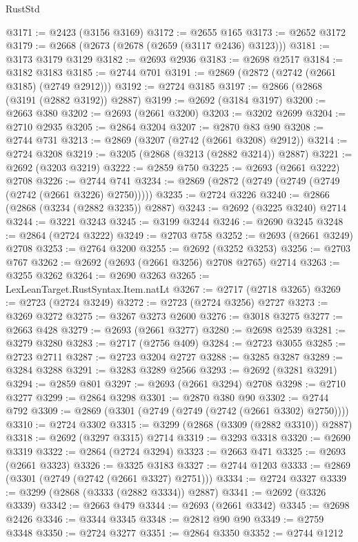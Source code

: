 \begin{lexlean}{RustStd}
\begin{coremodule}
@3171 := @2423 (@3156 @3169)
@3172 := @2655 @165
@3173 := @2652 @3172
@3179 := @2668 (@2673 (@2678 (@2659 (@3117 @2436) @3123)))
@3181 := @3173 @3179 @3129
@3182 := @2693 @2936
@3183 := @2698 @2517
@3184 := @3182 @3183
@3185 := @2744 @701
@3191 := @2869 (@2872 (@2742 (@2661 @3185) (@2749 @2912)))
@3192 := @2724 @3185
@3197 := @2866 (@2868 (@3191 (@2882 @3192)) @2887)
@3199 := @2692 (@3184 @3197)
@3200 := @2663 @380
@3202 := @2693 (@2661 @3200)
@3203 := @3202 @2699
@3204 := @2710 @2935
@3205 := @2864 @3204
@3207 := @2870 @83 @90
@3208 := @2744 @731
@3213 := @2869 (@3207 (@2742 (@2661 @3208) @2912))
@3214 := @2724 @3208
@3219 := @3205 (@2868 (@3213 (@2882 @3214)) @2887)
@3221 := @2692 (@3203 @3219)
@3222 := @2859 @750
@3225 := @2693 (@2661 @3222) @2708
@3226 := @2744 @741
@3234 := @2869 (@2872 (@2749 (@2749 (@2749 (@2742 (@2661 @3226) @2750)))))
@3235 := @2724 @3226
@3240 := @2866 (@2868 (@3234 (@2882 @3235)) @2887)
@3243 := @2692 (@3225 @3240) @2714
@3244 := @3221 @3243
@3245 := @3199 @3244
@3246 := @2690 @3245
@3248 := @2864 (@2724 @3222)
@3249 := @2703 @758
@3252 := @2693 (@2661 @3249) @2708
@3253 := @2764 @3200
@3255 := @2692 (@3252 @3253)
@3256 := @2703 @767
@3262 := @2692 (@2693 (@2661 @3256) @2708 @2765) @2714
@3263 := @3255 @3262
@3264 := @2690 @3263
@3265 := LexLeanTarget.RustSyntax.Item.natLt
@3267 := @2717 (@2718 @3265)
@3269 := @2723 (@2724 @3249)
@3272 := @2723 (@2724 @3256) @2727
@3273 := @3269 @3272
@3275 := @3267 @3273 @2600
@3276 := @3018 @3275
@3277 := @2663 @428
@3279 := @2693 (@2661 @3277)
@3280 := @2698 @2539
@3281 := @3279 @3280
@3283 := @2717 (@2756 @409)
@3284 := @2723 @3055
@3285 := @2723 @2711
@3287 := @2723 @3204 @2727
@3288 := @3285 @3287
@3289 := @3284 @3288
@3291 := @3283 @3289 @2566
@3293 := @2692 (@3281 @3291)
@3294 := @2859 @801
@3297 := @2693 (@2661 @3294) @2708
@3298 := @2710 @3277
@3299 := @2864 @3298
@3301 := @2870 @380 @90
@3302 := @2744 @792
@3309 := @2869 (@3301 (@2749 (@2749 (@2742 (@2661 @3302) @2750))))
@3310 := @2724 @3302
@3315 := @3299 (@2868 (@3309 (@2882 @3310)) @2887)
@3318 := @2692 (@3297 @3315) @2714
@3319 := @3293 @3318
@3320 := @2690 @3319
@3322 := @2864 (@2724 @3294)
@3323 := @2663 @471
@3325 := @2693 (@2661 @3323)
@3326 := @3325 @3183
@3327 := @2744 @1203
@3333 := @2869 (@3301 (@2749 (@2742 (@2661 @3327) @2751)))
@3334 := @2724 @3327
@3339 := @3299 (@2868 (@3333 (@2882 @3334)) @2887)
@3341 := @2692 (@3326 @3339)
@3342 := @2663 @479
@3344 := @2693 (@2661 @3342)
@3345 := @2698 @2426
@3346 := @3344 @3345
@3348 := @2812 @90 @90
@3349 := @2759 @3348
@3350 := @2724 @3277
@3351 := @2864 @3350
@3352 := @2744 @1212

\end{coremodule}
\end{lexlean}

